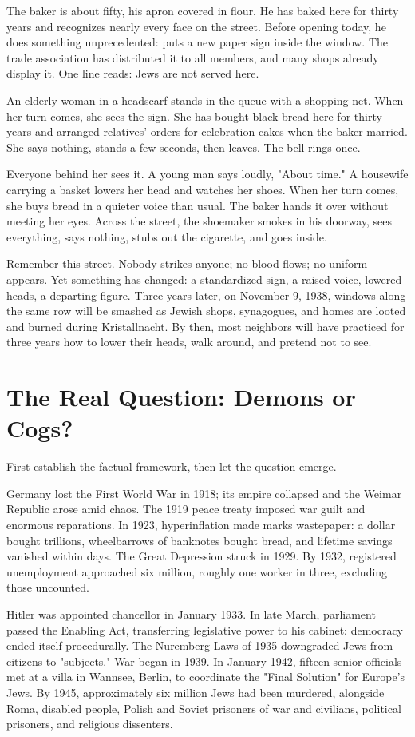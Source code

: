 The baker is about fifty, his apron covered in flour. He has baked here for thirty years and recognizes nearly every face on the street. Before opening today, he does something unprecedented: puts a new paper sign inside the window. The trade association has distributed it to all members, and many shops already display it. One line reads: Jews are not served here.

An elderly woman in a headscarf stands in the queue with a shopping net. When her turn comes, she sees the sign. She has bought black bread here for thirty years and arranged relatives' orders for celebration cakes when the baker married. She says nothing, stands a few seconds, then leaves. The bell rings once.

Everyone behind her sees it. A young man says loudly, "About time." A housewife carrying a basket lowers her head and watches her shoes. When her turn comes, she buys bread in a quieter voice than usual. The baker hands it over without meeting her eyes. Across the street, the shoemaker smokes in his doorway, sees everything, says nothing, stubs out the cigarette, and goes inside.

Remember this street. Nobody strikes anyone; no blood flows; no uniform appears. Yet something has changed: a standardized sign, a raised voice, lowered heads, a departing figure. Three years later, on November 9, 1938, windows along the same row will be smashed as Jewish shops, synagogues, and homes are looted and burned during Kristallnacht. By then, most neighbors will have practiced for three years how to lower their heads, walk around, and pretend not to see.

\section{The Real Question: Demons or Cogs?}
First establish the factual framework, then let the question emerge.

Germany lost the First World War in 1918; its empire collapsed and the Weimar Republic arose amid chaos. The 1919 peace treaty imposed war guilt and enormous reparations. In 1923, hyperinflation made marks wastepaper: a dollar bought trillions, wheelbarrows of banknotes bought bread, and lifetime savings vanished within days. The Great Depression struck in 1929. By 1932, registered unemployment approached six million, roughly one worker in three, excluding those uncounted.

Hitler was appointed chancellor in January 1933. In late March, parliament passed the Enabling Act, transferring legislative power to his cabinet: democracy ended itself procedurally. The Nuremberg Laws of 1935 downgraded Jews from citizens to "subjects." War began in 1939. In January 1942, fifteen senior officials met at a villa in Wannsee, Berlin, to coordinate the "Final Solution" for Europe's Jews. By 1945, approximately six million Jews had been murdered, alongside Roma, disabled people, Polish and Soviet prisoners of war and civilians, political prisoners, and religious dissenters.

